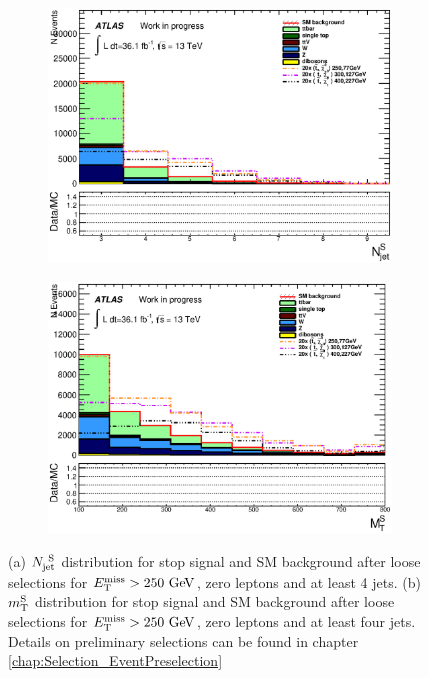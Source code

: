 \begin{figure}[h]
  \begin{center}
    \begin{subfigure}[b]{0.40\textwidth}
        \includegraphics[width=\textwidth]{figures/plotSR/SR_ND1_NjV_0SR.eps}%
        \caption{ }
    \end{subfigure}
    \begin{subfigure}[b]{0.40\textwidth}
        \includegraphics[width=\textwidth]{figures/plotSR/SR_ND1_MS_0SR.eps}%
                \caption{ }
    \end{subfigure}
\caption[$\NjV$ and $\MS$ distributions for stop signal and SM background after lose selections for $\met>250 \gev$, zero leptons and at least four jets]{ (a) $\NjV$ distribution for stop signal and SM background after loose selections for $\met>250 \gev$, zero leptons and at least 4 jets.  (b) $\MS$ distribution for stop signal and SM background after loose selections for $\met>250 \gev$, zero leptons and at least four jets. Details on preliminary selections can be found in chapter \ref{chap:Selection_EventPreselection} }
\label{fig:presel:jet_MS} 
\end{center}
\end{figure}

